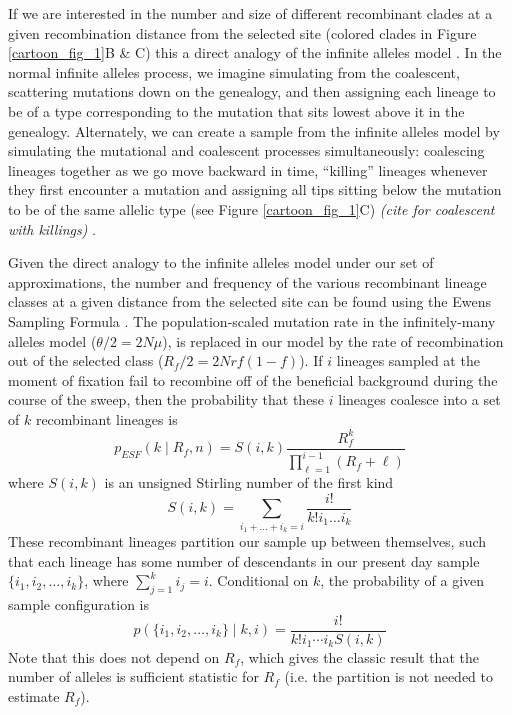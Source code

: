 \documentclass[a4paper,10pt]{article}
\newcommand{\jb}[1]{{\it\color{blue} (#1)} }
\begin{document}
If we are interested in the number and size of different recombinant clades at a given recombination distance from the selected site (colored clades in Figure \ref{cartoon_fig_1}B \& C) this a direct analogy of the infinite alleles model \citep{}. In the normal infinite alleles process, we imagine simulating from the coalescent, scattering mutations down on the genealogy, and then assigning each lineage to be of a type corresponding to the mutation that sits lowest above it in the genealogy. Alternately, we can create a sample from the infinite alleles model by simulating the mutational and coalescent processes simultaneously: coalescing lineages together as we go move backward in time, ``killing'' lineages whenever they first encounter a mutation and assigning all tips sitting below the mutation to be of the same allelic type (see Figure \ref{cartoon_fig_1}C) \jb{cite for coalescent with killings}.

Given the direct analogy to the infinite alleles model under our set of approximations, the number and frequency of the various recombinant lineage classes at a given distance from the selected site can be found using the Ewens Sampling Formula \citep{Ewens1972}. The population-scaled mutation rate in the infinitely-many alleles model ($\theta/2=2N\mu$), is replaced in our model by the rate of recombination out of the selected class ($R_{f}/2=2Nrf(1-f)$). If $i$ lineages sampled at the moment of fixation fail to recombine off of the beneficial background during the course of the sweep, then the probability that these $i$ lineages coalesce into a set of $k$ recombinant lineages is 
\begin{equation}
	p_{ESF}(k \mid R_f,n)  = S(i,k) \frac{R_f^k}{ \prod_{\ell=1}^{i-1} (R_f +\ell) }  \label{ESF1}
\end{equation}
where $S(i,k)$ is an unsigned Stirling number of the first kind
\begin{equation}
	S(i,k) = \sum_{i_1 + \dots + i_k = i} \frac{i!}{k!i_1\dots i_k}
\end{equation}
These recombinant lineages partition our sample up between themselves, such that each lineage has some number of descendants in our present day sample $\{i_1,i_2,\dots,i_k\}$, where $\sum_{j=1}^k i_j =i$. Conditional on $k$, the probability of a given sample configuration is
\begin{equation}
	p(\{i_1,i_2,\dots,i_k\} \mid k,i) = \frac{i!}{k! i_1\cdots i_k S(i,k)}  \label{ESF2}
\end{equation}
Note that this does not depend on $R_f$, which gives the classic result that the number of alleles is sufficient statistic for $R_f$ (i.e. the partition is not needed to estimate $R_f$).
\end{document}

